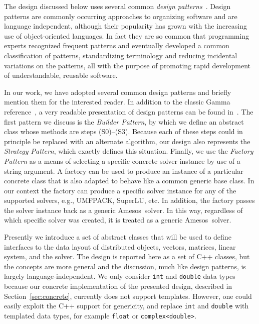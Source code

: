 \documentclass[acmtoms,acmnow]{acmtrans2m}
\newcommand{\amesos}{{\sc Amesos}}
\begin{document}
The design discussed below uses several common \textit{design
patterns}~\cite{Gamma}.  Design patterns are commonly occurring
approaches to organizing software and are language independent,
although their popularity has grown with the increasing use of
object-oriented languages. In fact they are so common that
programming experts recognized frequent patterns and eventually
developed a common classification of patterns, standardizing
terminology and reducing incidental variations on the patterns, all
with the purpose of promoting rapid development of understandable,
reusable software.

In our work, we have adopted several common design patterns and
briefly mention them for the interested reader. In addition to the
classic Gamma reference~\cite{Gamma}, a very readable presentation
of design patterns can be found in~\cite{HeadFirstDesignPatterns}.
The first pattern we discuss is the \textit{Builder Pattern}, by
which we define an abstract class whose methods are steps
(S0)--(S3). Because each of these steps could in principle be
replaced with an alternate algorithm, our design also represents the
\textit{Strategy Pattern}, which exactly defines this situation.
Finally, we use the \textit{Factory Pattern} as a means of selecting
a specific concrete solver instance by use of a string argument.  A
factory can be used to produce an instance of a particular concrete
class that is also adapted to behave like a common generic base
class. In our context the factory can produce a specific solver
instance for any of the supported solvers, e.g., UMFPACK, SuperLU,
etc.  In addition, the factory passes the solver instance back as a
generic \amesos\ solver. In this way, regardless of which specific
solver was created, it is treated as a generic \amesos\ solver.

Presently we introduce a set of abstract classes that will be used
to define interfaces to the data layout of distributed objects,
vectors, matrices, linear system, and the solver. The design is
reported here as a set of C++ classes, but the concepts are more
general and the discussion, much like design patterns, is largely
language-independent. We only consider {\tt int} and {\tt double}
data types because our concrete implementation of the presented
design, described in Section~\ref{sec:concrete}, currently does not
support templates. However, one could easily exploit the C++ support
for genericity, and replace {\tt int} and {\tt double} with
templated data types, for example \verb!float! or
\verb!complex<double>!.
\end{document}
